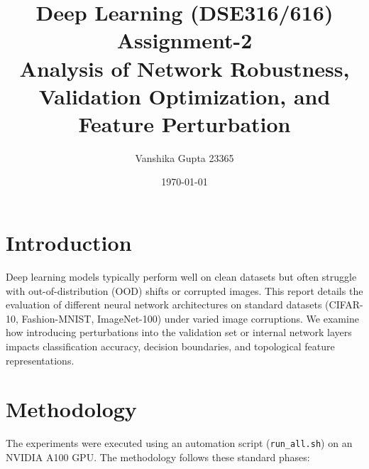 \documentclass[12pt,a4paper]{article}
\title{\textbf{Deep Learning (DSE316/616) Assignment-2} \\ \Large Analysis of Network Robustness, Validation Optimization, and Feature Perturbation}
\author{Vanshika Gupta 23365}
\date{\today}
\begin{document}
\maketitle
\tableofcontents
\newpage

\section{Introduction}
Deep learning models typically perform well on clean datasets but often struggle with out-of-distribution (OOD) shifts or corrupted images. This report details the evaluation of different neural network architectures on standard datasets (CIFAR-10, Fashion-MNIST, ImageNet-100) under varied image corruptions. We examine how introducing perturbations into the validation set or internal network layers impacts classification accuracy, decision boundaries, and topological feature representations.

\section{Methodology}
The experiments were executed using an automation script (\texttt{run\_all.sh}) on an NVIDIA A100 GPU. The methodology follows these standard phases:
\end{document}
